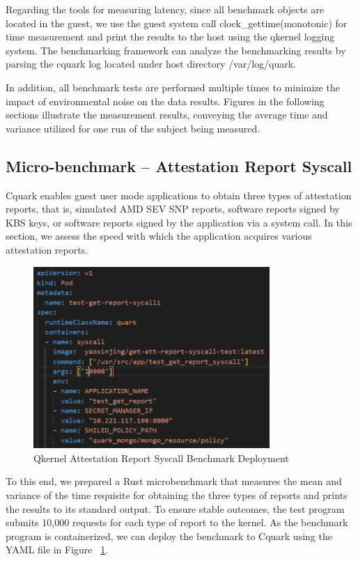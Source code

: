 Regarding the tools for measuring latency, since all benchmark objects are located in the guest, we use the guest system call clock\_gettime(monotonic) for time measurement and print the results to the host using the qkernel logging system. The benchmarking framework can analyze the benchmarking results by parsing the cquark log located under host directory /var/log/quark.

In addition, all benchmark tests are performed multiple times to minimize the impact of environmental noise on the data results. Figures in the following sections illustrate the measurement results, conveying the average time and variance utilized for one run of the subject being measured.


\subsection{Micro-benchmark – Attestation Report Syscall}

Cquark enables guest user mode applications to obtain three types of attestation reports, that is, simulated AMD SEV SNP reports, software reports signed by KBS keys, or software reports signed by the application via a system call. In this section, we assess the speed with which the application 
acquires various attestation reports.

\begin{figure}[H]
    \centering
    \includegraphics[width=0.8\textwidth]{images/perf_attestation_report_yaml.PNG}
    \caption[Qkernel Attestation Report Syscall Benchmark Deployment]{Qkernel Attestation Report Syscall Benchmark Deployment}
    \label{fig:perf_attestation_report_yaml}
\end{figure}

To this end, we prepared a Rust microbenchmark that measures the mean and variance of the time requisite for obtaining the three types of reports and prints the results to its standard output. To ensure stable outcomes, the test program submits 10,000 requests for each type of report to the kernel. 
As the benchmark program is containerized, we can deploy the benchmark to Cquark using the YAML file in Figure ~\ref{fig:perf_attestation_report_yaml}.

